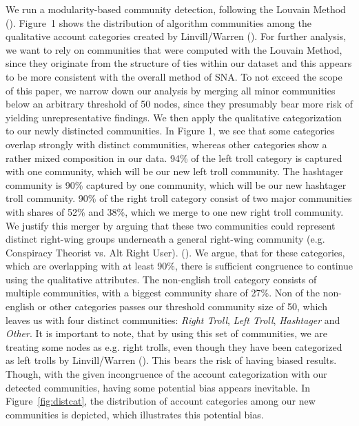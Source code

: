 \documentclass[12pt, titlepage=true, toc=bib]{scrartcl}
\begin{document}
We run a modularity-based community detection, following the Louvain Method (\cite{blondel_fast_2008}). Figure~1 shows the distribution of algorithm communities among the qualitative account categories created by Linvill/Warren (\cite*{linvill_troll_2018}). For further analysis, we want to rely on communities that were computed with the Louvain Method, since they originate from the structure of ties within our dataset and this appears to be more consistent with the overall method of SNA. To not exceed the scope of this paper, we narrow down our analysis by merging all minor communities below an arbitrary threshold of 50 nodes, since they presumably bear more risk of yielding unrepresentative findings. We then apply the qualitative categorization to our newly distincted communities. In Figure 1, we see that some categories overlap strongly with distinct communities, whereas other categories show a rather mixed composition in our data. 94\% of the left troll category is captured with one community, which will be our new left troll community. The hashtager community is 90\% captured by one community, which will be our new hashtager troll community. 90\% of the right troll category consist of two major communities with shares of 52\% and 38\%, which we merge to one new right troll community. We justify this merger by arguing that these two communities could represent distinct right-wing groups underneath a general right-wing community (e.g. Conspiracy Theorist vs. Alt Right User). (\cite{kaiser_unite_2018}).  We argue, that for these categories, which are overlapping with at least 90\%, there is sufficient congruence to continue using the qualitative attributes. The non-english troll category consists of multiple communities, with a biggest community share of 27\%. Non of the non-english or other categories passes our threshold community size of 50, which leaves us with four distinct communities: \textit{Right Troll}, \textit{Left Troll}, \textit{Hashtager} and \textit{Other}. It is important to note, that by using this set of communities, we are treating some nodes as e.g. right trolls, even though they have been categorized as left trolls by Linvill/Warren (\cite*{linvill_troll_2018}). This bears the risk of having biased results. Though, with the given incongruence of the account categorization with our detected communities, having some potential bias appears inevitable. In Figure~\ref{fig:distcat}, the distribution of account categories among our new communities is depicted, which illustrates this potential bias.
\end{document}
